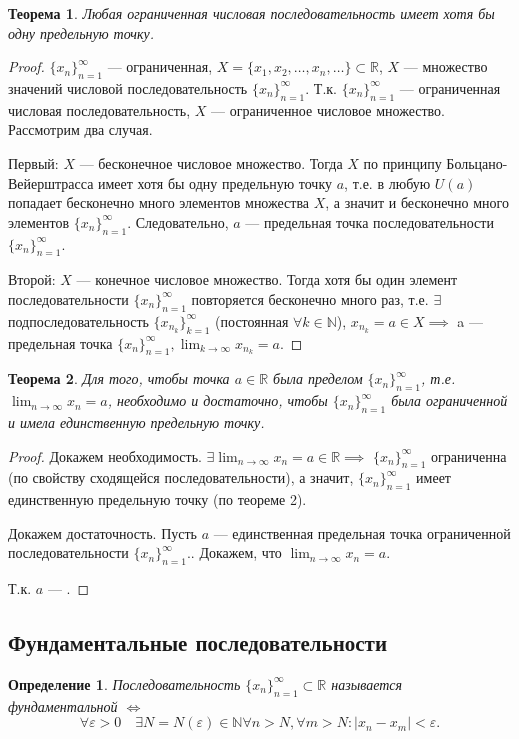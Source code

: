 \documentclass[a4paper,12pt]{article} %
\newtheorem{definition}{Определение}[subsection]
\newtheorem{theorem}{Теорема}[subsection]
\theoremstyle{remark}
\begin{document}
\begin{theorem}
	Любая ограниченная числовая последовательность имеет хотя бы одну предельную точку.
\end{theorem}
\begin{proof}
	$\{x_n\}_{n=1}^{\infty}$ --- ограниченная, $X = \{x_1, x_2, \ldots, x_n, \ldots\} \subset \mathbb{R}$, $X$ --- множество значений числовой последовательность $\{x_n\}_{n=1}^{\infty}$. Т.к. $\{x_n\}_{n=1}^{\infty}$ --- ограниченная числовая последовательность, $X$ --- ограниченное числовое множество.
	Рассмотрим два случая.

	Первый: $X$ --- бесконечное числовое множество. Тогда $X$ по принципу Больцано-Вейерштрасса имеет хотя бы одну предельную точку $a$, т.е. в любую $U(a)$ попадает бесконечно много элементов множества $X$, а значит и бесконечно много элементов $\{x_n\}_{n=1}^{\infty}$. Следовательно, $a$ --- предельная точка последовательности $\{x_n\}_{n=1}^{\infty}$.

	Второй: $X$ --- конечное числовое множество. Тогда хотя бы один элемент последовательности $\{x_n\}_{n=1}^{\infty}$ повторяется бесконечно много раз, т.е. $\exists$ подпоследовательность $\{x_{n_k}\}_{k=1}^{\infty}$ (постоянная $\forall k\in \mathbb{N}$), $x_{n_k} = a\in  X \implies$ a --- предельная точка $\{x_n\}_{n=1}^{\infty}, \lim_{k \to \infty} x_{n_k} = a$.
\end{proof}

\begin{theorem}
	Для того, чтобы точка $a\in \mathbb{R}$ была пределом $\{x_n\}_{n=1}^{\infty}$, т.е. $\lim_{n \to \infty} x_n = a$, необходимо и достаточно, чтобы $\{x_n\}_{n=1}^{\infty}$ была ограниченной и имела единственную предельную точку.
\end{theorem}
\begin{proof}
	Докажем необходимость.
	$\exists \lim_{n \to \infty} x_n = a \in \mathbb{R} \implies$ $\{x_n\}_{n=1}^{\infty}$ ограниченна (по свойству сходящейся последовательности), а значит, $\{x_n\}_{n=1}^{\infty}$ имеет единственную предельную точку (по теореме 2).

	Докажем достаточность. Пусть $a$ --- единственная предельная точка ограниченной последовательности $\{x_n\}_{n=1}^{\infty}.$. Докажем, что $\lim_{n \to \infty} x_n = a$.

	Т.к. $a$ --- .
\end{proof}



\subsection{Фундаментальные последовательности}
\begin{definition}
	Последовательность $\{x_n\}_{n=1}^{\infty} \subset  \mathbb{R}$ называется фундаментальной $\iff $
	\[
	\forall \varepsilon>0 \quad \exists N=N(\varepsilon) \in  \mathbb{N} \forall n>N, \forall m>N : |x_n-x_m|<\varepsilon
	.\] 
\end{definition}
\end{document}
